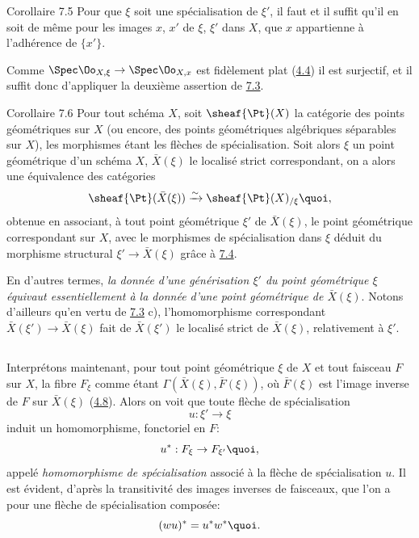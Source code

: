 \documentclass[10pt]{../fichiers-configuration-latex/smfart}
\begin{document}
\begin{enonce*}{Corollaire 7.5}
Pour que $\xi$ soit une spécialisation de $\xi'$, il faut et il
suffit qu'il en soit de même pour les images $x$, $x'$ de $\xi$,
$\xi'$ dans $X$, \ie que $x$ appartienne à l'adhérence de $\{x'\}$.
\end{enonce*}

Comme $\Spec \Oo_{X, \xi} \to \Spec \Oo_{X, x}$ est
fidèlement plat (\hyperref[VIII.subsec4.4]{4.4}) il est surjectif,
et il suffit donc d'appliquer
la deuxième assertion de \hyperref[VIII.lem7.3]{7.3}.

\begin{enonce*}{Corollaire 7.6}
Pour tout schéma $X$, soit $\sheaf{\Pt}(X)$ la catégorie des points
géométriques sur $X$ (ou encore, des points géométriques algébriques
séparables sur $X$), les morphismes étant les flèches de
spécialisation. Soit alors $\xi$ un point géométrique d'un schéma
$X$, $\bar{X}(\xi)$ le localisé strict correspondant, on a alors une
équivalence des catégories
$$
\sheaf{\Pt}(\bar{X}(\xi)) \xrightarrow{\sim} \sheaf{\Pt}(X)_{/\xi}{\quoi},
$$
obtenue en associant, à tout point géométrique $\xi'$ de
$\bar{X}(\xi)$, le point géométrique correspondant sur $X$, avec le
morphismes de spécialisation dans $\xi$ déduit du morphisme structural
$\xi' \to \bar{X}(\xi)$ grâce à \hyperref[VIII.prop7.4]{7.4}.
\end{enonce*}

En d'autres termes, \emph{la donnée d'une générisation $\xi'$ du point
géométrique $\xi$ équivaut essentiellement à la donnée d'une point
géométrique de $\bar{X}(\xi)$}. Notons d'ailleurs qu'en
vertu de \hyperref[VIII.lem7.3]{7.3} c), l'homomorphisme correspondant\pageoriginale $\bar{X}(\xi') \to
\bar{X}(\xi)$ fait de $\bar{X}(\xi')$ le localisé strict de
$\bar{X}(\xi)$, relativement à $\xi'$.

\setcounter{subsection}{6}
\subsection{}

Interprétons maintenant, pour tout point géométrique
$\xi$ de $X$ et
tout faisceau $F$ sur $X$, la fibre $F_{\xi}$ comme étant $\Gamma
(\bar{X} (\xi), \bar{F}(\xi))$, où $\bar{F}(\xi)$ est l'image inverse
de $F$ sur $\bar{X}(\xi)$ (\hyperref[VIII.cor4.8]{4.8}). Alors on voit que toute flèche de
spécialisation
$$
u : \xi'\to \xi
$$
induit un homomorphisme, fonctoriel en $F$:
$$
u^{\ast} : F_{\xi} \to F_{\xi'}{\quoi},
$$
appelé \emph{homomorphisme de spécialisation} associé à la flèche de
spécialisation $u$. Il est évident, d'après la transitivité des
images inverses de faisceaux, que l'on a pour une flèche de
spécialisation composée:
$$
(wu)^{\ast} = u^{\ast} w^{\ast}{\quoi}.
$$
\end{document}
